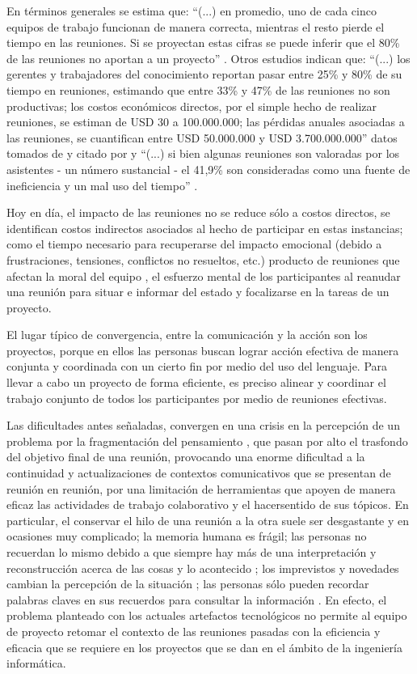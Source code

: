 En términos generales se estima que: “(...) en promedio, uno de cada cinco equipos de trabajo funcionan de manera correcta, mientras el resto pierde el tiempo en las reuniones. Si se proyectan estas cifras se puede inferir que el 80\% de las reuniones no aportan a un proyecto” . Otros estudios indican que: “(...) los gerentes y trabajadores del conocimiento reportan pasar entre 25\% y 80\% de su tiempo en reuniones, estimando que entre 33\% y 47\% de las reuniones no son productivas; los costos económicos directos, por el simple hecho de realizar reuniones, se estiman de USD 30 a 100.000.000; las pérdidas anuales asociadas a las reuniones, se cuantifican entre USD 50.000.000 y USD 3.700.000.000” datos tomados de  y citado por  y “(...) si bien algunas reuniones son valoradas por los asistentes - un número sustancial - el 41,9\% son consideradas como una fuente de ineficiencia y un mal uso del tiempo” .

Hoy en día, el impacto de las reuniones no se reduce sólo a costos directos, se identifican costos indirectos asociados al hecho de participar en estas instancias; como el tiempo necesario para recuperarse del impacto emocional (debido a frustraciones, tensiones, conflictos no resueltos, etc.) producto de reuniones que afectan la moral del equipo , el esfuerzo mental de los participantes al reanudar una reunión para situar e informar del estado y focalizarse en la tareas de un proyecto.

El lugar típico de convergencia, entre la comunicación y la acción son los proyectos, porque en ellos las personas buscan lograr acción efectiva de manera conjunta y coordinada con un cierto fin por medio del uso del lenguaje. Para llevar a cabo un proyecto de forma eficiente, es preciso alinear y coordinar el trabajo conjunto de todos los participantes por medio de reuniones efectivas.

Las dificultades antes se\~naladas, convergen en una crisis en la percepción de un problema por la fragmentación del pensamiento , que pasan por alto el trasfondo del objetivo final de una reunión, provocando una enorme dificultad a la continuidad y actualizaciones de contextos comunicativos que se presentan de reunión en reunión, por una limitación de herramientas que apoyen de manera eficaz las actividades de trabajo colaborativo  y el hacer\-sentido de sus tópicos. En particular, el conservar el hilo de una reunión a la otra suele ser desgastante y en ocasiones muy complicado; la memoria humana es frágil; las personas no recuerdan lo mismo debido a que siempre hay más de una interpretación y reconstrucción acerca de las cosas y lo acontecido ; los imprevistos y novedades cambian la percepción de la situación ; las personas sólo pueden recordar palabras claves en sus recuerdos para consultar la información . En efecto, el problema planteado con los actuales artefactos tecnológicos no permite al equipo de proyecto retomar el contexto de las reuniones pasadas con la eficiencia y eficacia que se requiere en los proyectos que se dan en el ámbito de la ingeniería informática.

